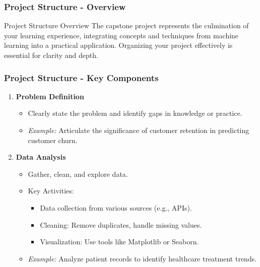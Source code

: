 \documentclass{beamer}
\begin{document}
\begin{frame}[fragile]
    \frametitle{Project Structure - Overview}
    \begin{block}{Project Structure Overview}
        The capstone project represents the culmination of your learning experience, integrating concepts and techniques from machine learning into a practical application. Organizing your project effectively is essential for clarity and depth.
    \end{block}
\end{frame}

\begin{frame}[fragile]
    \frametitle{Project Structure - Key Components}
    \begin{enumerate}
        \item \textbf{Problem Definition}
        \begin{itemize}
            \item Clearly state the problem and identify gaps in knowledge or practice.
            \item \textit{Example:} Articulate the significance of customer retention in predicting customer churn.
        \end{itemize}

        \item \textbf{Data Analysis}
        \begin{itemize}
            \item Gather, clean, and explore data.
            \item Key Activities:
                \begin{itemize}
                    \item Data collection from various sources (e.g., APIs).
                    \item Cleaning: Remove duplicates, handle missing values.
                    \item Visualization: Use tools like Matplotlib or Seaborn.
                \end{itemize}
            \item \textit{Example:} Analyze patient records to identify healthcare treatment trends.
        \end{itemize}
    \end{enumerate}
\end{frame}
\end{document}
